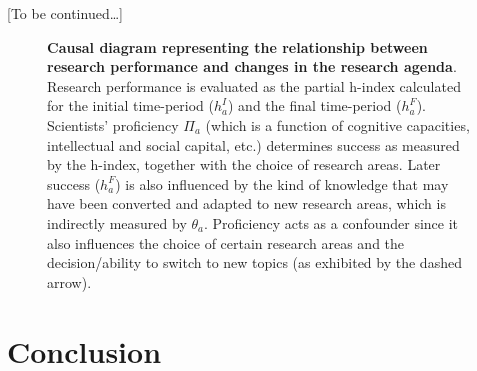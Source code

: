 \documentclass{article}
\begin{document}
[To be continued\dots]

\begin{figure}
    \centering
    \caption{\textbf{Causal diagram representing the relationship between research performance and changes in the research agenda}. Research performance is evaluated as the partial h-index calculated for the initial time-period ($h_a^I$) and the final time-period ($h_a^F$). Scientists' proficiency $\Pi_a$ (which is a function of cognitive capacities, intellectual and social capital, etc.) determines success as measured by the h-index, together with the choice of research areas. Later success ($h_a^F$) is also influenced by the kind of knowledge that may have been converted and adapted to new research areas, which is indirectly measured by $\theta_a$. Proficiency acts as a confounder since it also influences the choice of certain research areas and the decision/ability to switch to new topics (as exhibited by the dashed arrow). }
    \label{fig:outcomes_causal_dag}
\end{figure}


\section{Conclusion}
\end{document}
